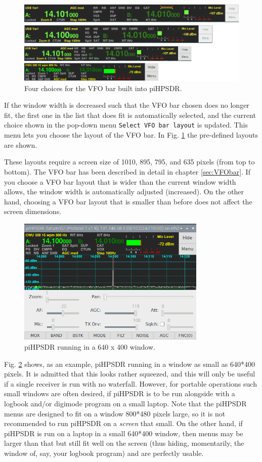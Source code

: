 \documentclass[12pt]{book}
\def\rett#1{\texttt{\color{red}#1}}
\begin{document}
\begin{figure}[ht!]
\center
\includegraphics[width=12cm]{VFObarChoice.png}
\caption{Four choices for the VFO bar built into piHPSDR.}
\label{fig:VFObarChoice}
\end{figure}

If the window width is decreased such that the VFO bar chosen does no longer fit,
the first one in the list that does fit is automatically selected, and the
current choice shown in the
 pop-down menu \rett{Select VFO bar layout} is updated. This menu lets you choose
 the layout of the VFO
bar. In Fig. \ref{fig:VFObarChoice} the pre-defined layouts are shown.



These layouts require a screen size of 1010, 895, 795, and 635 pixels (from top to
bottom).
The VFO bar has been described in detail in chapter
\ref{sec:VFObar}. If you choose a VFO bar layout that is wider than the current
window width allows, the window width is automatically adjusted (increased). On the
other hand, choosing a VFO bar layout that is smaller than before does not affect
the screen dimensions.

\begin{figure}[ht!]
\center
\includegraphics[width=9cm]{640x400.png}
\caption{piHPSDR running in a 640 x 400 window.}
\label{fig:640x400}
\end{figure}

Fig. \ref{fig:640x400} shows, as an example, piHPSDR running in a window as small
as 640*400 pixels. It is admitted that this looks rather squeezed, and this
will only be useful if a single receiver is run with no waterfall. However, for
portable operations such small windows are often desired,
if piHPSDR is to be run alongside with a logbook and/or digimode program on a small laptop.
Note that the piHPSDR menus are designed to fit on a window 800*480 pixels large, so
it is not recommended to run piHPSDR on a \textit{screen} that small. On the other hand,
if piHPSDR is run on a laptop in a small 640*400 window, then menus may be larger than
that but still fit well on the screen (thus hiding, momentarily, the window of,
say, your logbook program) and are perfectly usable.
\end{document}
